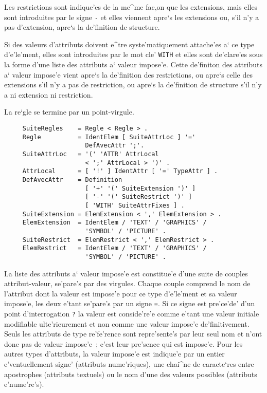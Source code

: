 {Les restrictions sont indique'es de la me^me fac,on que les extensions, mais
elles sont introduites par le signe {\tt -} et elles viennent apre`s les
extensions ou, s'il n'y a pas d'extension, apre`s la de'finition de structure.

Si des valeurs d'attributs doivent e^tre syste'matiquement attache'es
a` ce type d'e'le'ment, elles sont introduites par le mot cle' {\tt WITH}
et elles sont de'clare'es sous la forme d'une liste des attributs a` valeur
impose'e. Cette de'finiton des attributs a` valeur impose'e vient apre`s la
de'finition des restrictions, ou apre`s celle des extensions s'il n'y a pas de
restriction, ou apre`s la de'finition de structure s'il n'y a ni extension ni
restriction.

La re`gle se termine par un point-virgule.

\begin{verbatim}
     SuiteRegles    = Regle < Regle > .
     Regle          = IdentElem [ SuiteAttrLoc ] '='
                      DefAvecAttr ';'.
     SuiteAttrLoc   = '(' 'ATTR' AttrLocal
                      < ';' AttrLocal > ')' .
     AttrLocal      = [ '!' ] IdentAttr [ '=' TypeAttr ] .
     DefAvecAttr    = Definition
                      [ '+' '(' SuiteExtension ')' ]
                      [ '-' '(' SuiteRestrict ')' ]
                      [ 'WITH' SuiteAttrFixes ] .
     SuiteExtension = ElemExtension < ',' ElemExtension > .
     ElemExtension  = IdentElem / 'TEXT' / 'GRAPHICS' /
                      'SYMBOL' / 'PICTURE' .
     SuiteRestrict  = ElemRestrict < ',' ElemRestrict > .
     ElemRestrict   = IdentElem / 'TEXT' / 'GRAPHICS' /
                      'SYMBOL' / 'PICTURE' .
\end{verbatim}

La liste des attributs a` valeur impose'e est constitue'e d'une suite de
couples attribut-valeur, se'pare's par des virgules. Chaque couple
comprend le nom de l'attribut dont la valeur est impose'e pour ce type
d'e'le'ment et sa valeur impose'e, les deux e'tant se'pare's par un signe {\tt =}.
Si ce signe est pre'ce'de' d'un point d'interrogation {\tt ?}
la valeur est conside're'e comme e'tant une valeur initiale
modifiable ulte'rieurement et non comme une valeur impose'e de'finitivement.
Seuls les attributs de type re'fe'rence sont repre'sente's par leur seul nom
et n'ont donc pas de valeur impose'e~; c'est leur pre'sence qui est impose'e.
Pour les autres types d'attributs, la valeur impose'e est indique'e par un
entier e'ventuellement signe' (attributs nume'riques), une chai^ne de caracte`res
entre apostrophes (attributs textuels) ou le nom d'une des valeurs possibles
(attributs e'nume're's).

}
